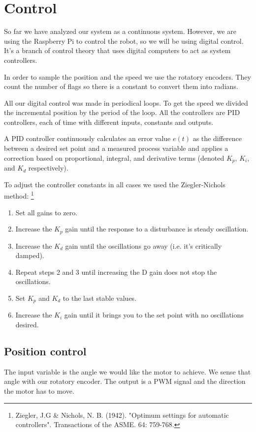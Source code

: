 \section{Control}
So far we have analyzed our system as a continuous system.
However, we are using the Raspberry Pi to control the robot, so we will
be using digital control. It's a branch of control theory that uses
digital computers to act as system controllers.

In order to sample the position and the speed we use the rotatory encoders.
They count the number of flags so there is a constant to convert them into radians.

All our digital control was made in periodical loops. To get the speed we
divided the incremental position by the period of the loop. All the controllers
are PID controllers, each of time with different inputs, constants and outputs.

A PID controller continuously calculates an error value $e(t)$ as the difference between
a desired set point and a measured process variable and applies a
correction based on proportional, integral, and derivative terms
(denoted $K_p$, $K_i$, and $K_d$ respectively).

To adjust the controller constants in all cases we used the Ziegler-Nichols method:
\footnote{Ziegler, J.G \& Nichols, N. B. (1942). "Optimum settings for automatic controllers".
 Transactions of the ASME. 64: 759-768.}

\begin{enumerate}
    \item Set all gains to zero.
    \item Increase the $K_p$ gain until the response to a disturbance is steady oscillation.
    \item Increase the $K_d$ gain until the oscillations go away (i.e. it's critically damped).
    \item Repeat steps 2 and 3 until increasing the D gain does not stop the oscillations.
    \item Set $K_p$ and $K_d$ to the last stable values.
    \item Increase the $K_i$ gain until it brings you to the set point with no oscillations desired.
\end{enumerate}

\subsection{Position control}
The input variable is the angle we would like the motor to achieve. We sense that angle
with our rotatory encoder. The output is a PWM signal and the direction the motor has to move.

